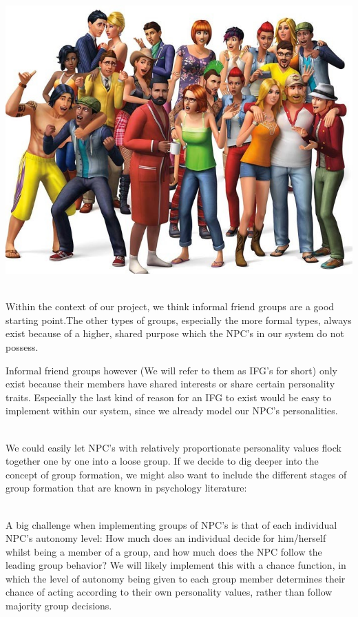 \documentclass[11pt]{article} %
\begin{document}
~\\
\includegraphics[scale=0.4]{SimsGroup}


~\\
Within the context of our project, we think informal friend groups are a good starting point.The other types of groups, especially the more formal types, always exist because of a higher, shared purpose which the NPC's in our system do not possess. 



\newpage
Informal friend groups however  (We will refer to them as IFG's for short) only exist because their members have shared interests or share certain personality traits. Especially the last kind of reason for an IFG to exist would be easy to implement within our system, since we already model our NPC's personalities. 

~\\
We could easily let NPC's with relatively proportionate personality values flock together one by one into a loose group. If we decide to dig deeper into the concept of group formation, we might also want to include the different stages of group formation that are known in psychology literature: %

~\\
A big challenge when implementing groups of NPC's is that of each individual NPC's autonomy level: How much does an individual decide for him/herself whilst being a member of a group, and how much does the NPC follow the leading group behavior? We will likely implement this with a chance function, in which the level of autonomy being given to each group member determines their chance of acting according to their own personality values, rather than follow majority group decisions. 
\end{document}
